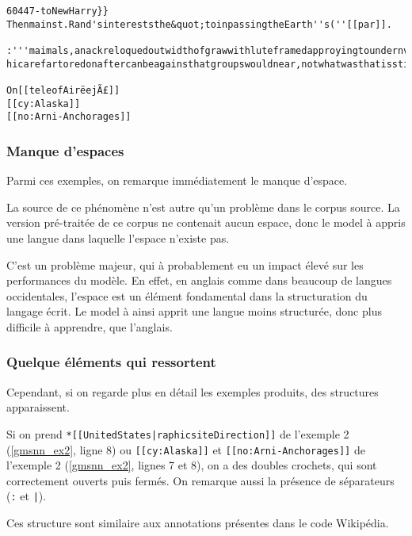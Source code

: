 \begin{lstlisting}[caption={Exemple 3~: des termes balisé comme dans l'exemple 2, et une autre suite de carractères.},label=gmsnn_ex3]
60447-toNewHarry}}
Thenmainst.Rand'sintereststhe&quot;toinpassingtheEarth''s(''[[par]].

:'''maimals,anackreloquedoutwidthofgrawwithluteframedapproyingtoundernverby[[hebesination]]of&lt;/smalkan,instablishedacondorttodevelopedframesbeforestatedwinkingaroundinrational hicarefartoredonaftercanbeagainsthatgroupswouldnear,notwhatwasthatisstillastructionCenter,toDagnythat

On[[teleofAirëejÃ£]]
[[cy:Alaska]]
[[no:Arni-Anchorages]]
\end{lstlisting}

\subsubsection{Manque d'espaces}
Parmi ces exemples, on remarque immédiatement le manque d'espace.

La source de ce phénomène n'est autre qu'un problème dans le corpus source.
La version pré-traitée de ce corpus ne contenait aucun espace, donc le \gls{model} à appris une langue dans laquelle l'espace n'existe pas.

C'est un problème majeur, qui à probablement eu un impact élevé sur les performances du modèle. En effet, en anglais comme dans beaucoup de langues occidentales, l'espace est un élément fondamental dans la structuration du langage écrit. Le \gls{model} à ainsi apprit une langue moins structurée, donc plus difficile à apprendre, que l'anglais.

\subsubsection{Quelque éléments qui ressortent}
Cependant, si on regarde plus en détail les exemples produits, des structures apparaissent. 

Si on prend \lstinline!*[[UnitedStates|raphicsiteDirection]]! de l'exemple 2 (\autoref{gmsnn_ex2}, ligne 8) ou 
\lstinline![[cy:Alaska]]! et \lstinline![[no:Arni-Anchorages]]! de l'exemple 2 (\autoref{gmsnn_ex2}, lignes 7 et 8), on a des doubles crochets, qui sont correctement ouverts puis fermés. On remarque aussi la présence de séparateurs (\lstinline!:! et \lstinline!|!).

Ces structure sont similaire aux annotations présentes dans le code Wikipédia.

